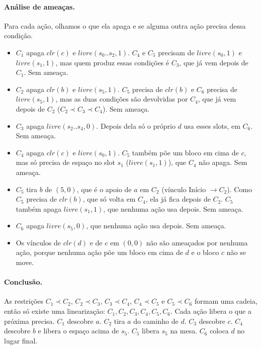 \documentclass[11pt,a4paper]{article}
\newcommand{\clr}{\mathit{clr}}
\newcommand{\livre}{\mathit{livre}}
\begin{document}
\paragraph{Análise de ameaças.} Para cada ação, olhamos o que ela apaga e se alguma
outra ação precisa dessa condição.
\begin{itemize}
  \item $C_1$ apaga $\clr(c)$ e $\livre(s_0..s_2,1)$. $C_4$ e $C_5$ precisam de
        $\livre(s_0,1)$ e $\livre(s_1,1)$, mas quem produz essas condições é $C_3$,
        que já vem depois de $C_1$. Sem ameaça.
  \item $C_2$ apaga $\clr(b)$ e $\livre(s_5,1)$. $C_5$ precisa de $\clr(b)$ e $C_6$
        precisa de $\livre(s_5,1)$, mas as duas condições são devolvidas por $C_4$,
        que já vem depois de $C_2$ ($C_2\prec C_3\prec C_4$). Sem ameaça.
  \item $C_3$ apaga $\livre(s_2..s_4,0)$. Depois dela só o próprio $d$ usa esses
        slots, em $C_6$. Sem ameaça.
  \item $C_4$ apaga $\clr(c)$ e $\livre(s_0,1)$. $C_5$ também põe um bloco em cima
        de $c$, mas só precisa de espaço no slot $s_1$ ($\livre(s_1,1)$), que $C_4$
        não apaga. Sem ameaça.
  \item $C_5$ tira $b$ de $(5,0)$, que é o apoio de $a$ em $C_2$ (vínculo Início
        $\to C_2$). Como $C_5$ precisa de $\clr(b)$, que só volta em $C_4$, ela já
        fica depois de $C_2$. $C_5$ também apaga $\livre(s_1,1)$, que nenhuma ação
        usa depois. Sem ameaça.
  \item $C_6$ apaga $\livre(s_5,0)$, que nenhuma ação usa depois. Sem ameaça.
  \item Os vínculos de $\clr(d)$ e de $c$ em $(0,0)$ não são ameaçados por nenhuma
        ação, porque nenhuma ação põe um bloco em cima de $d$ e o bloco $c$ não se
        move.
\end{itemize}

\paragraph{Conclusão.} As restrições $C_1\prec C_2$, $C_2\prec C_3$, $C_3\prec C_4$,
$C_4\prec C_5$ e $C_5\prec C_6$ formam uma cadeia, então só existe uma linearização:
$C_1, C_2, C_3, C_4, C_5, C_6$. Cada ação libera o que a próxima precisa. $C_1$
descobre $a$. $C_2$ tira $a$ do caminho de $d$. $C_3$ descobre $c$. $C_4$ descobre
$b$ e libera o espaço acima de $s_5$. $C_5$ libera $s_5$ na mesa. $C_6$ coloca $d$
no lugar final.
\end{document}
